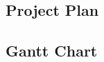 \documentclass[12pt]{article}  %
\begin{document}
\begin{appendices}

\let\cleardoublepage\clearpage
\section{Project Plan}
\label{appendix:gantt}
\subsection{Gantt Chart}



\end{appendices}
\end{document}

